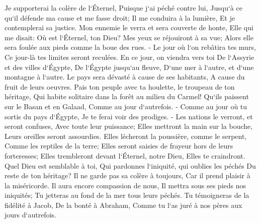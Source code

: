\verse Je supporterai la colère de l`Éternel, Puisque j`ai péché contre lui, Jusqu`à ce qu`il défende ma cause et me fasse droit; Il me conduira à la lumière, Et je contemplerai sa justice. 
\verse Mon ennemie le verra et sera couverte de honte, Elle qui me disait: Où est l`Éternel, ton Dieu? Mes yeux se réjouiront à sa vue; Alors elle sera foulée aux pieds comme la boue des rues. - 
\verse Le jour où l`on rebâtira tes murs, Ce jour-là tes limites seront reculées. 
\verse En ce jour, on viendra vers toi De l`Assyrie et des villes d`Égypte, De l`Égypte jusqu`au fleuve, D`une mer à l`autre, et d`une montagne à l`autre. 
\verse Le pays sera dévasté à cause de ses habitants, A cause du fruit de leurs oeuvres. 
\verse Pais ton peuple avec ta houlette, le troupeau de ton héritage, Qui habite solitaire dans la forêt au milieu du Carmel! Qu`ils paissent sur le Basan et en Galaad, Comme au jour d`autrefois. - 
\verse Comme au jour où tu sortis du pays d`Égypte, Je te ferai voir des prodiges. - 
\verse Les nations le verront, et seront confuses, Avec toute leur puissance; Elles mettront la main sur la bouche, Leurs oreilles seront assourdies. 
\verse Elles lécheront la poussière, comme le serpent, Comme les reptiles de la terre; Elles seront saisies de frayeur hors de leurs forteresses; Elles trembleront devant l`Éternel, notre Dieu, Elles te craindront. 
\verse Quel Dieu est semblable à toi, Qui pardonnes l`iniquité, qui oublies les péchés Du reste de ton héritage? Il ne garde pas sa colère à toujours, Car il prend plaisir à la miséricorde. 
\verse Il aura encore compassion de nous, Il mettra sous ses pieds nos iniquités; Tu jetteras au fond de la mer tous leurs péchés. 
\verse Tu témoigneras de la fidélité à Jacob, De la bonté à Abraham, Comme tu l`as juré à nos pères aux jours d`autrefois. 
